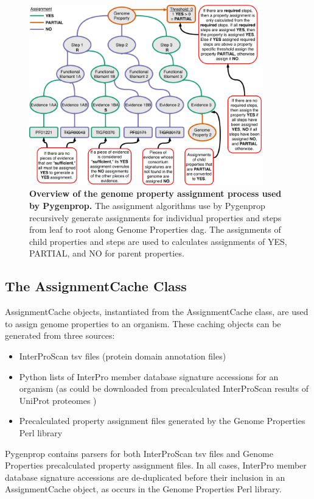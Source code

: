 \begin{figure}[!ht]
  \centering
	\includegraphics[width=0.90\textwidth]{media/Pygenprop_Assignment.pdf}
	 \caption[Overview of the genome property assignment process used by 
Pygenprop.]{\textbf{Overview of the genome property assignment process used by 
Pygenprop.} The assignment algorithms use by Pygenprop recursively generate 
assignments for individual properties and steps from leaf to root along Genome 
Properties \gls{dag}. The assignments of child properties and steps are used to 
calculates assignments of YES, PARTIAL, and NO for parent properties.}
	 \label{fig:propertyassignment}
\end{figure}

\subsection{The AssignmentCache Class} \label{AssignmentCache}

AssignmentCache objects, instantiated from the AssignmentCache class, are used 
to assign genome properties to an organism. These caching objects can be 
generated from three sources: 

\FloatBarrier
\begin{itemize}
\item InterProScan \gls{tsv} files (protein domain annotation files) 
\item Python lists of InterPro member database signature accessions for an 
organism (as could be downloaded from precalculated InterProScan results of 
UniProt proteomes \cite{uniprot2014uniprot})
\item Precalculated property assignment files generated by the Genome Properties 
Perl library
\end{itemize}
Pygenprop contains parsers for both InterProScan \gls{tsv} files and Genome 
Properties precalculated property assignment files. In all cases, InterPro 
member database signature accessions are de-duplicated before their inclusion in 
an AssignmentCache object, as occurs in the Genome Properties Perl library.

